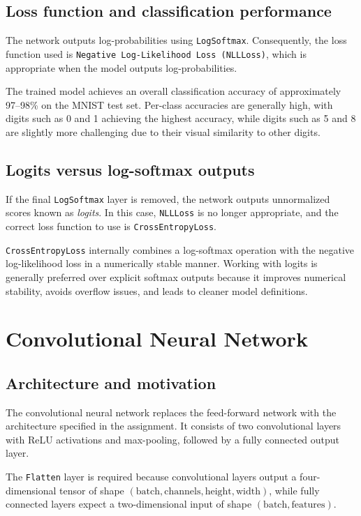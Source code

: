 \documentclass[11pt,a4paper]{article}
\begin{document}
\subsection{Loss function and classification performance}
The network outputs log-probabilities using \texttt{LogSoftmax}. Consequently, the loss function used is \texttt{Negative Log-Likelihood Loss (NLLLoss)}, which is appropriate when the model outputs log-probabilities.

The trained model achieves an overall classification accuracy of approximately 97--98\% on the MNIST test set. Per-class accuracies are generally high, with digits such as 0 and 1 achieving the highest accuracy, while digits such as 5 and 8 are slightly more challenging due to their visual similarity to other digits.

\subsection{Logits versus log-softmax outputs}
If the final \texttt{LogSoftmax} layer is removed, the network outputs unnormalized scores known as \emph{logits}. In this case, \texttt{NLLLoss} is no longer appropriate, and the correct loss function to use is \texttt{CrossEntropyLoss}.

\texttt{CrossEntropyLoss} internally combines a log-softmax operation with the negative log-likelihood loss in a numerically stable manner. Working with logits is generally preferred over explicit softmax outputs because it improves numerical stability, avoids overflow issues, and leads to cleaner model definitions.

\section{Convolutional Neural Network}

\subsection{Architecture and motivation}
The convolutional neural network replaces the feed-forward network with the architecture specified in the assignment. It consists of two convolutional layers with ReLU activations and max-pooling, followed by a fully connected output layer.

The \texttt{Flatten} layer is required because convolutional layers output a four-dimensional tensor of shape $(\text{batch}, \text{channels}, \text{height}, \text{width})$, while fully connected layers expect a two-dimensional input of shape $(\text{batch}, \text{features})$.
\end{document}
